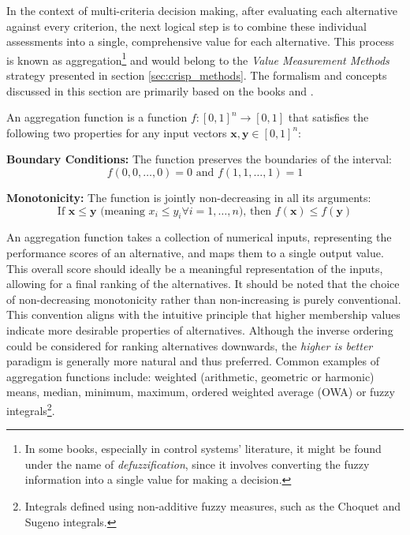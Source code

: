 In the context of multi-criteria decision making, after evaluating each alternative against every criterion, the next logical step is to combine these individual assessments into a single, comprehensive value for each alternative. This process is known as aggregation\footnote{In some books, especially in control systems' literature, it might be found under the name of \textit{defuzzification}, since it involves converting the fuzzy information into a single value for making a decision.} and would belong to the \emph{Value Measurement Methods} strategy presented in section \ref{sec:crisp_methods}. The formalism and concepts discussed in this section are primarily based on the books \cite{beliakov2023discrete} and \cite{xu2015uncertain}.

\begin{definition} \label{def:aggregation_function}
An aggregation function is a function $f: [0, 1]^n \to [0, 1]$ that satisfies the following two properties for any input vectors $\mathbf{x}, \mathbf{y} \in [0, 1]^n$:
\begin{romanenum}
    \item \textbf{Boundary Conditions:} The function preserves the boundaries of the interval:
    \[f(0, 0, \dots, 0) = 0\text{ and }f(1, 1, \dots, 1) = 1\]
    \item \textbf{Monotonicity:} The function is jointly non-decreasing in all its arguments:
    \[\text{If }\mathbf{x} \le \mathbf{y}\text{ (meaning }x_i \le y_i \forall i=1, \dots, n\text{), then }f(\mathbf{x}) \le f(\mathbf{y})\]
\end{romanenum}
\end{definition}

An aggregation function takes a collection of numerical inputs, representing the performance scores of an alternative, and maps them to a single output value. This overall score should ideally be a meaningful representation of the inputs, allowing for a final ranking of the alternatives. It should be noted that the choice of non-decreasing monotonicity rather than non-increasing is purely conventional. This convention aligns with the intuitive principle that higher membership values indicate more desirable properties of alternatives. Although the inverse ordering could be considered for ranking alternatives downwards, the \textit{higher is better} paradigm is generally more natural and thus preferred. Common examples of aggregation functions include: weighted (arithmetic, geometric or harmonic) means, median, minimum, maximum, ordered weighted average (OWA) or fuzzy integrals\footnote{Integrals defined using non-additive fuzzy measures, such as the Choquet and Sugeno integrals.}.\\

